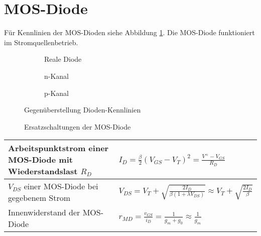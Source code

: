 \section{MOS-Diode}
Für Kennlinien der MOS-Dioden siehe Abbildung \ref{fig:diodenKennlinien}. Die MOS-Diode funktioniert im Stromquellenbetrieb.
\begin{figure}[h]
	\centering
	\begin{subfigure}[b]{2cm}
		\centering
		\caption{Reale Diode}
	\end{subfigure} \quad
	\begin{subfigure}[b]{3cm}
			\centering
	\end{subfigure} \quad
	\begin{subfigure}[b]{3cm}
		\centering
		\caption{n-Kanal}
	\end{subfigure}
	\begin{subfigure}[b]{3cm}
		\centering
		\caption{p-Kanal}
	\end{subfigure}
	\begin{subfigure}[b]{3cm}
		\centering
	\end{subfigure}	
	\hspace{1.5cm}
			
	\caption{Gegenüberstellung Dioden-Kennlinien}
	\label{fig:diodenKennlinien}
\end{figure}

\begin{figure}[h]
	\centering
	\begin{subfigure}[b]{5cm}
		\centering
	\end{subfigure} \qquad\qquad
	\begin{subfigure}[b]{3cm}
		\centering
	\end{subfigure} \qquad\qquad
	\begin{subfigure}[b]{2cm}
		\centering
	\end{subfigure}
	\caption{Ersatzschaltungen der MOS-Diode}
\end{figure}

\begin{tabular}{|l|l|}
	\hline
	Arbeitspunktstrom einer MOS-Diode mit Wiederstandslast $R_D$
	& $I_D = \frac{\beta}{2} (V_{GS} -V_T)^2 = \frac{V^+ - V_{GS}}{R_D} $
	\\ \hline
	$V_{DS}$ einer MOS-Diode bei gegebenem Strom
	& $ V_{DS} = V_T + \sqrt{\frac{2I_D}{\beta(1+\lambda V_{DS})}} \approx V_T + \sqrt{\frac{2I_D}{\beta}} $
	\\ \hline
	Innenwiderstand der MOS-Diode
	& $ r_{MD} = \frac{v_{GS}}{i_D} = \frac{1}{g_m + g_0} \approx \frac{1}{g_m} $
	\\ \hline	
\end{tabular}

